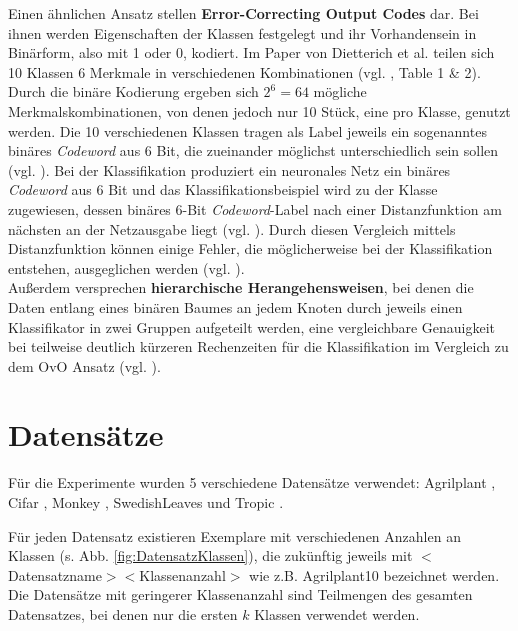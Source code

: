 Einen ähnlichen Ansatz stellen \textbf{Error-Correcting Output Codes} \cite{errorCorrectingCodes} dar. Bei ihnen werden Eigenschaften der Klassen festgelegt und ihr Vorhandensein in Binärform, also mit 1 oder 0, kodiert. Im Paper von Dietterich et al. \cite{errorCorrectingCodes} teilen sich 10 Klassen 6 Merkmale in verschiedenen Kombinationen (vgl. \cite{errorCorrectingCodes}, Table 1 \& 2). Durch die binäre Kodierung ergeben sich $2^6 = 64$ mögliche Merkmalskombinationen, von denen jedoch nur 10 Stück, eine pro Klasse, genutzt werden. Die 10 verschiedenen Klassen tragen als Label jeweils ein sogenanntes binäres \textit{Codeword} aus 6 Bit, die zueinander möglichst unterschiedlich sein sollen (vgl. \cite{errorCorrectingCodes}). Bei der Klassifikation produziert ein neuronales Netz ein binäres \textit{Codeword} aus 6 Bit und das Klassifikationsbeispiel wird zu der Klasse zugewiesen, dessen binäres 6-Bit \textit{Codeword}-Label nach einer Distanzfunktion am nächsten an der Netzausgabe liegt (vgl. \cite{errorCorrectingCodes}). Durch diesen Vergleich mittels Distanzfunktion können einige Fehler, die möglicherweise bei der Klassifikation entstehen, ausgeglichen werden (vgl. \cite{errorCorrectingCodes}).\\


Außerdem versprechen \textbf{hierarchische Herangehensweisen}, bei denen die Daten entlang eines binären Baumes an jedem Knoten durch jeweils einen Klassifikator in zwei Gruppen aufgeteilt werden, eine vergleichbare Genauigkeit bei teilweise deutlich kürzeren Rechenzeiten für die Klassifikation im Vergleich zu dem OvO Ansatz (vgl. \cite{hierarchischeMethoden}).

\newpage
\section{Datensätze}
\label{ch:methodik_datensaetze}
Für die Experimente wurden 5 verschiedene Datensätze verwendet: Agrilplant \cite{pawaraWebsiteDatensaetze}, Cifar \cite{cifar10}, Monkey \cite{pawaraWebsiteDatensaetze}, SwedishLeaves \cite{swedishLeaves} und Tropic \cite{pawaraWebsiteDatensaetze}.

Für jeden Datensatz existieren Exemplare mit verschiedenen Anzahlen an Klassen (s. Abb. \ref{fig:DatensatzKlassen}), die zukünftig jeweils mit $<$Datensatzname$><$Klassenanzahl$>$ wie z.B. Agrilplant10 bezeichnet werden.
Die Datensätze mit geringerer Klassenanzahl sind Teilmengen des gesamten Datensatzes, bei denen nur die ersten $k$ Klassen verwendet werden.

